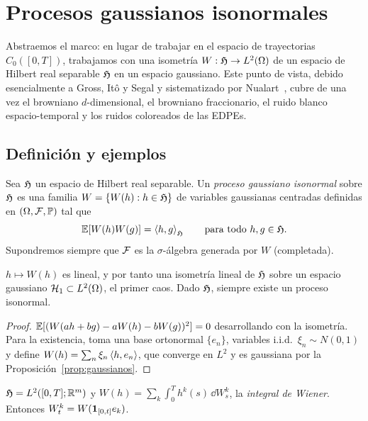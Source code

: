 \chapter{Procesos gaussianos isonormales}\label{cap:isonormales}

\begin{panorama}
Abstraemos el marco: en lugar de trabajar en el espacio de trayectorias $C_0([0,T])$,
trabajamos con una isometría $W:\mathfrak{H}\to L^2(\Omega)$ de un espacio de Hilbert real separable
$\mathfrak{H}$ en un espacio gaussiano. Este punto de vista, debido esencialmente a Gross, Itô y
Segal y sistematizado por Nualart~\cite{Nualart06}, cubre de una vez el browniano $d$-dimensional, el
browniano fraccionario, el ruido blanco espacio-temporal y los ruidos coloreados de las
EDPEs.
\end{panorama}

\section{Definición y ejemplos}

\begin{definicion}
Sea $\mathfrak{H}$ un espacio de Hilbert real separable. Un \emph{proceso gaussiano isonormal}
sobre $\mathfrak{H}$ es una familia $W=\{W(h):h\in\mathfrak{H}\}$ de variables gaussianas centradas definidas en
$(\Omega,\mathcal{F},\mathbb{P})$ tal que
\[
  \mathbb{E}[W(h)W(g)]=\left\langle h, g\right\rangle_{\mathfrak{H}}\qquad\text{para todo }h,g\in\mathfrak{H}.
\]
Supondremos siempre que $\mathcal{F}$ es la $\sigma$-álgebra generada por $W$ (completada).
\end{definicion}

\begin{proposicion}
$h\mapsto W(h)$ es lineal, y por tanto una isometría lineal de $\mathfrak{H}$ sobre un espacio
gaussiano $\mathcal{H}_1\subset L^2(\Omega)$, \textup{el primer caos}. Dado $\mathfrak{H}$, siempre existe un proceso isonormal.
\end{proposicion}

\begin{proof}
$\mathbb{E}[(W(ah+bg)-aW(h)-bW(g))^2]=0$ desarrollando con la isometría. Para
la existencia, toma una base ortonormal $\{e_n\}$, variables i.i.d.\ $\xi_n\sim N(0,1)$ y define $W(h)=
\sum_n\xi_n\left\langle h, e_n\right\rangle$, que converge en $L^2$ y es gaussiana por la Proposición~\ref{prop:gaussianos}.
\end{proof}

\begin{ejemplo}[Browniano]
$\mathfrak{H}=L^2([0,T];\mathbb{R}^m)$ y $W(h)=\sum_k\int_0^Th^k(s)\,\dd W^k_s$, la \emph{integral de
Wiener}. Entonces $W^k_t=W(\mathbf{1}_{[0,t]}e_k)$.
\end{ejemplo}

